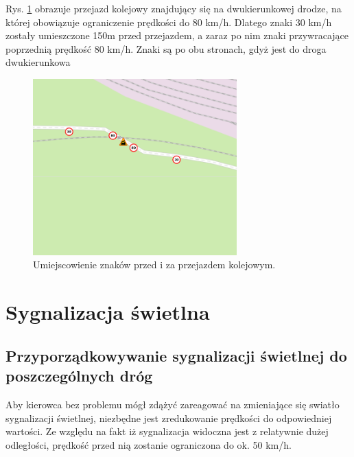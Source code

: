 Rys. \ref{sec:PrzejazdyKolejowe1} obrazuje przejazd kolejowy znajdujący się na dwukierunkowej drodze, na której obowiązuje ograniczenie prędkości do 80 km/h. Dlatego znaki 30 km/h zostały umieszczone 150m przed przejazdem, a zaraz po nim znaki przywracające poprzednią prędkość 80 km/h. Znaki są po obu stronach, gdyż jest do droga dwukierunkowa

\begin{figure}[h]
\caption{Umiejscowienie znaków przed i za przejazdem kolejowym.}
\label{sec:PrzejazdyKolejowe1}
\centering
\includegraphics[width=0.7\textwidth]{streetBeforeRail}
\end{figure}


\newpage
\section{Sygnalizacja świetlna}
\subsection{Przyporządkowywanie sygnalizacji świetlnej do poszczególnych dróg}

Aby kierowca bez problemu mógł zdążyć zareagować na zmieniające się swiatło sygnalizacji świetlnej, niezbędne jest zredukowanie prędkości do odpowiedniej wartości. Ze względu na fakt iż sygnalizacja widoczna jest z relatywnie dużej odległości, prędkość przed nią zostanie ograniczona do ok. 50 km/h.


